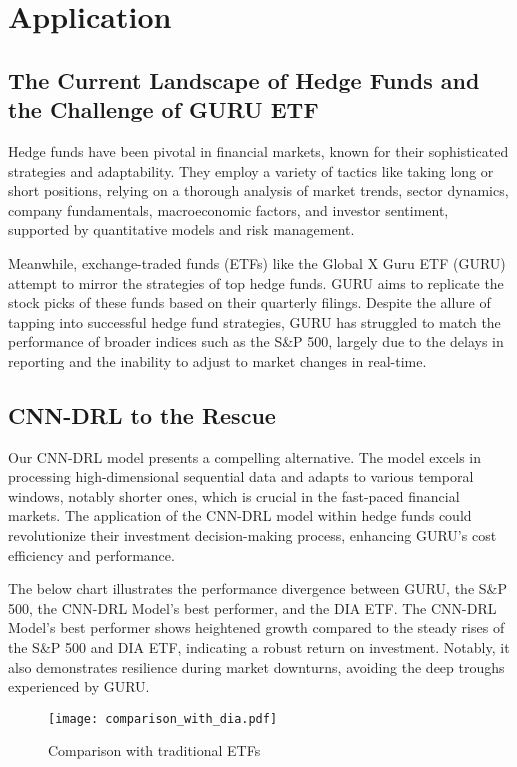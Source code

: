 \section{Application}

\subsection{The Current Landscape of Hedge Funds and the Challenge of GURU ETF}
 Hedge funds have been pivotal in financial markets, known for their sophisticated strategies and adaptability. They employ a variety of tactics like taking long or short positions, relying on a thorough analysis of market trends, sector dynamics, company fundamentals, macroeconomic factors, and investor sentiment, supported by quantitative models and risk management.

Meanwhile, exchange-traded funds (ETFs) like the Global X Guru ETF (GURU) attempt to mirror the strategies of top hedge funds. GURU aims to replicate the stock picks of these funds based on their quarterly filings. Despite the allure of tapping into successful hedge fund strategies, GURU has struggled to match the performance of broader indices such as the S\&P 500, largely due to the delays in reporting and the inability to adjust to market changes in real-time.

\subsection{CNN-DRL to the Rescue}
Our CNN-DRL model presents a compelling alternative. The model excels in processing high-dimensional sequential data and adapts to various temporal windows, notably shorter ones, which is crucial in the fast-paced financial markets. The application of the CNN-DRL model within hedge funds could revolutionize their investment decision-making process, enhancing GURU's cost efficiency and performance.

The below chart illustrates the performance divergence between GURU, the S\&P 500, the CNN-DRL Model's best performer, and the DIA ETF. The CNN-DRL Model's best performer shows heightened growth compared to the steady rises of the S\&P 500 and DIA ETF, indicating a robust return on investment. Notably, it also demonstrates resilience during market downturns, avoiding the deep troughs experienced by GURU.

\begin{figure}[ht]
    \centering
    \texttt{[image: comparison\_with\_dia.pdf]}
    \caption{Comparison with traditional ETFs}
    \label{fig:comparison_with_dia}
\end{figure}

